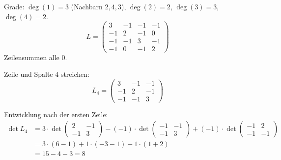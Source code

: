 \begin{aufgabe}
Grade: $\deg(1) = 3$ (Nachbarn $2,4,3$), $\deg(2) = 2$, $\deg(3) = 3$, $\deg(4) = 2$.
\[ L = \begin{pmatrix} 3 & -1 & -1 & -1\\ -1 & 2 & -1 & 0\\ -1 & -1 & 3 & -1\\ -1 & 0 & -1 & 2 \end{pmatrix} \]
Zeilensummen alle $0$. \checkmark

Zeile und Spalte $4$ streichen:
\[ L_4 = \begin{pmatrix} 3 & -1 & -1\\ -1 & 2 & -1\\ -1 & -1 & 3 \end{pmatrix} \]

Entwicklung nach der ersten Zeile:
\begin{align*}
\det L_4 &= 3\cdot\det\!\begin{pmatrix}2 & -1\\ -1 & 3\end{pmatrix} - (-1)\cdot\det\!\begin{pmatrix}-1 & -1\\ -1 & 3\end{pmatrix} + (-1)\cdot\det\!\begin{pmatrix}-1 & 2\\ -1 & -1\end{pmatrix}\\[3pt]
&= 3\cdot(6 - 1) + 1\cdot(-3 - 1) - 1\cdot(1 + 2)\\
&= 15 - 4 - 3 = 8
\end{align*}

 \checkmark
\end{aufgabe}

